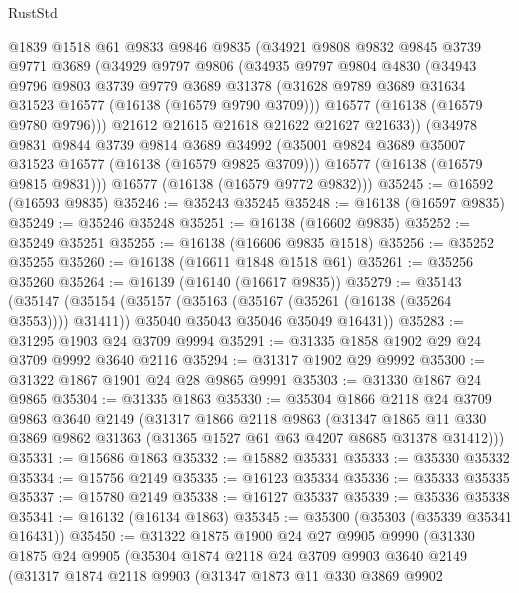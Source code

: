 \begin{lexlean}{RustStd}
\begin{coremodule}
    @1839
    @1518
    @61
    @9833
    @9846
    @9835
    (@34921
      @9808
      @9832
      @9845
      @3739
      @9771
      @3689
      (@34929
        @9797
        @9806
        (@34935
          @9797
          @9804
          @4830
          (@34943
            @9796
            @9803
            @3739
            @9779
            @3689
            @31378
            (@31628 @9789 @3689 @31634 @31523 @16577 (@16138 (@16579 @9790 @3709)))
            @16577
            (@16138 (@16579 @9780 @9796)))
          @21612
          @21615
          @21618
          @21622
          @21627
          @21633))
      (@34978
        @9831
        @9844
        @3739
        @9814
        @3689
        @34992
        (@35001 @9824 @3689 @35007 @31523 @16577 (@16138 (@16579 @9825 @3709)))
        @16577
        (@16138 (@16579 @9815 @9831)))
      @16577
      (@16138 (@16579 @9772 @9832)))
@35245 := @16592 (@16593 @9835)
@35246 := @35243 @35245
@35248 := @16138 (@16597 @9835)
@35249 := @35246 @35248
@35251 := @16138 (@16602 @9835)
@35252 := @35249 @35251
@35255 := @16138 (@16606 @9835 @1518)
@35256 := @35252 @35255
@35260 := @16138 (@16611 @1848 @1518 @61)
@35261 := @35256 @35260
@35264 := @16139 (@16140 (@16617 @9835))
@35279 := @35143
    (@35147
      (@35154
        (@35157 (@35163 (@35167 (@35261 (@16138 (@35264 @3553)))) @31411))
        @35040
        @35043
        @35046
        @35049
        @16431))
@35283 := @31295 @1903 @24 @3709 @9994
@35291 := @31335 @1858 @1902 @29 @24 @3709 @9992 @3640 @2116
@35294 := @31317 @1902 @29 @9992
@35300 := @31322 @1867 @1901 @24 @28 @9865 @9991
@35303 := @31330 @1867 @24 @9865
@35304 := @31335 @1863
@35330 := @35304
    @1866
    @2118
    @24
    @3709
    @9863
    @3640
    @2149
    (@31317
      @1866
      @2118
      @9863
      (@31347 @1865 @11 @330 @3869 @9862 @31363 (@31365 @1527 @61 @63 @4207 @8685 @31378 @31412)))
@35331 := @15686 @1863
@35332 := @15882 @35331
@35333 := @35330 @35332
@35334 := @15756 @2149
@35335 := @16123 @35334
@35336 := @35333 @35335
@35337 := @15780 @2149
@35338 := @16127 @35337
@35339 := @35336 @35338
@35341 := @16132 (@16134 @1863)
@35345 := @35300 (@35303 (@35339 @35341 @16431))
@35450 := @31322
    @1875
    @1900
    @24
    @27
    @9905
    @9990
    (@31330
      @1875
      @24
      @9905
      (@35304
        @1874
        @2118
        @24
        @3709
        @9903
        @3640
        @2149
        (@31317
          @1874
          @2118
          @9903
          (@31347
            @1873
            @11
            @330
            @3869
            @9902

\end{coremodule}
\end{lexlean}
